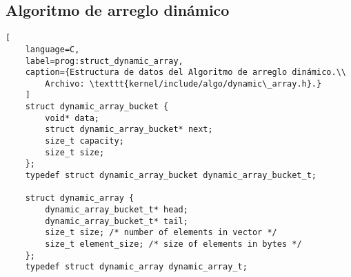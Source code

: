 \subsection{Algoritmo de arreglo dinámico}
\begin{lstlisting}[
	language=C,
	label=prog:struct_dynamic_array,
	caption={Estructura de datos del Algoritmo de arreglo dinámico.\\
		Archivo: \texttt{kernel/include/algo/dynamic\_array.h}.}
	]
	struct dynamic_array_bucket {
		void* data;
		struct dynamic_array_bucket* next;
		size_t capacity;
		size_t size;
	};
	typedef struct dynamic_array_bucket dynamic_array_bucket_t;
	
	struct dynamic_array {
		dynamic_array_bucket_t* head;
		dynamic_array_bucket_t* tail;
		size_t size; /* number of elements in vector */
		size_t element_size; /* size of elements in bytes */
	};
	typedef struct dynamic_array dynamic_array_t;
\end{lstlisting}